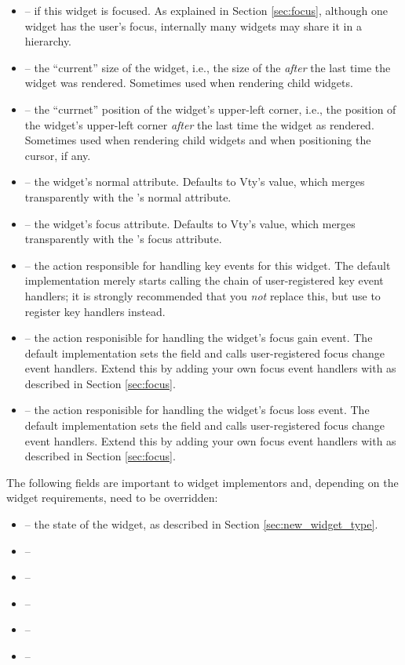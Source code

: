\begin{itemize}
\item {} --  if this widget is focused.  As
  explained in Section \ref{sec:focus}, although one widget has the
  user's focus, internally many widgets may share it in a hierarchy.
\item {} -- the ``current'' size of the widget, i.e.,
  the size of the  \textit{after} the last time the widget
  was rendered.  Sometimes used when rendering child widgets.
\item {} -- the ``currnet'' position of the widget's
  upper-left corner, i.e., the position of the widget's upper-left
  corner \textit{after} the last time the widget as rendered.
  Sometimes used when rendering child widgets and when positioning the
  cursor, if any.
\item {} -- the widget's normal attribute.  Defaults
  to Vty's  value, which merges transparently with the
  's normal attribute.
\item {} -- the widget's focus attribute.  Defaults
  to Vty's  value, which merges transparently with the
  's focus attribute.
\item {} -- the action responsible for handling key
  events for this widget.  The default implementation merely starts
  calling the chain of user-registered key event handlers; it is
  strongly recommended that you \textit{not} replace this, but use
   to register key handlers instead.
\item {} -- the action responisible for handling
  the widget's focus gain event.  The default implementation sets the
   field and calls user-registered focus change event
  handlers.  Extend this by adding your own focus event handlers with
   as described in Section \ref{sec:focus}.
\item {} -- the action responisible for handling
  the widget's focus loss event.  The default implementation sets the
   field and calls user-registered focus change event
  handlers.  Extend this by adding your own focus event handlers with
   as described in Section \ref{sec:focus}.
\end{itemize}

The following fields are important to widget implementors and,
depending on the widget requirements, need to be overridden:

\begin{itemize}
\item {} -- the state of the widget, as described in Section
  \ref{sec:new_widget_type}.
\item {} --
\item {} --
\item {} --
\item {} --
\item {} --
\end{itemize}

